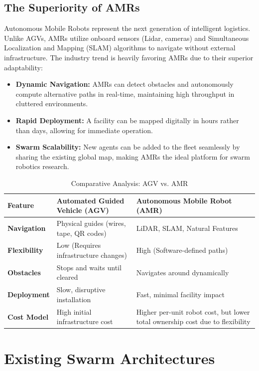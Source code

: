 \subsection{The Superiority of AMRs}
Autonomous Mobile Robots represent the next generation of intelligent logistics. Unlike AGVs, AMRs utilize onboard sensors (Lidar, cameras) and Simultaneous Localization and Mapping (SLAM) algorithms to navigate without external infrastructure. The industry trend is heavily favoring AMRs due to their superior adaptability:
\begin{itemize}
    \item \textbf{Dynamic Navigation:} AMRs can detect obstacles and autonomously compute alternative paths in real-time, maintaining high throughput in cluttered environments.
    \item \textbf{Rapid Deployment:} A facility can be mapped digitally in hours rather than days, allowing for immediate operation.
    \item \textbf{Swarm Scalability:} New agents can be added to the fleet seamlessly by sharing the existing global map, making AMRs the ideal platform for swarm robotics research.
\end{itemize}

\begin{table}[H]
\centering
\caption{Comparative Analysis: AGV vs. AMR}
\label{tab:agv_vs_amr}
\begin{tabular}{|l|p{5cm}|p{5cm}|}
\hline
\textbf{Feature} & \textbf{Automated Guided Vehicle (AGV)} & \textbf{Autonomous Mobile Robot (AMR)} \\
\hline
\textbf{Navigation} & Physical guides (wires, tape, QR codes) & LiDAR, SLAM, Natural Features \\
\hline
\textbf{Flexibility} & Low (Requires infrastructure changes) & High (Software-defined paths) \\
\hline
\textbf{Obstacles} & Stops and waits until cleared & Navigates around dynamically \\
\hline
\textbf{Deployment} & Slow, disruptive installation & Fast, minimal facility impact \\
\hline
\textbf{Cost Model} & High initial infrastructure cost & Higher per-unit robot cost, but lower total ownership cost due to flexibility \\
\hline
\end{tabular}
\end{table}

\section{Existing Swarm Architectures}
\label{sec:swarm_architectures}

